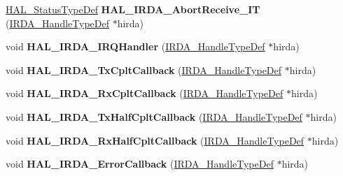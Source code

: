 \begin{DoxyCompactItemize}
\hyperlink{stm32f0xx__hal__def_8h_a63c0679d1cb8b8c684fbb0632743478f}{H\+A\+L\+\_\+\+Status\+Type\+Def} {\bfseries H\+A\+L\+\_\+\+I\+R\+D\+A\+\_\+\+Abort\+Receive\+\_\+\+IT} (\hyperlink{struct_i_r_d_a___handle_type_def}{I\+R\+D\+A\+\_\+\+Handle\+Type\+Def} $\ast$hirda)
\item 
\mbox{\label{group___i_r_d_a___exported___functions___group2_ga816a681851f93d038e7bda5193b9d933}} 
void {\bfseries H\+A\+L\+\_\+\+I\+R\+D\+A\+\_\+\+I\+R\+Q\+Handler} (\hyperlink{struct_i_r_d_a___handle_type_def}{I\+R\+D\+A\+\_\+\+Handle\+Type\+Def} $\ast$hirda)
\item 
\mbox{\label{group___i_r_d_a___exported___functions___group2_gaafb45ea63d8cd87e6856c320135b78dd}} 
void {\bfseries H\+A\+L\+\_\+\+I\+R\+D\+A\+\_\+\+Tx\+Cplt\+Callback} (\hyperlink{struct_i_r_d_a___handle_type_def}{I\+R\+D\+A\+\_\+\+Handle\+Type\+Def} $\ast$hirda)
\item 
\mbox{\label{group___i_r_d_a___exported___functions___group2_gafbebae7dda1e7b54dc664c95802127c6}} 
void {\bfseries H\+A\+L\+\_\+\+I\+R\+D\+A\+\_\+\+Rx\+Cplt\+Callback} (\hyperlink{struct_i_r_d_a___handle_type_def}{I\+R\+D\+A\+\_\+\+Handle\+Type\+Def} $\ast$hirda)
\item 
\mbox{\label{group___i_r_d_a___exported___functions___group2_gab2f5c3c37aae09155b6872f93f12761f}} 
void {\bfseries H\+A\+L\+\_\+\+I\+R\+D\+A\+\_\+\+Tx\+Half\+Cplt\+Callback} (\hyperlink{struct_i_r_d_a___handle_type_def}{I\+R\+D\+A\+\_\+\+Handle\+Type\+Def} $\ast$hirda)
\item 
\mbox{\label{group___i_r_d_a___exported___functions___group2_gab164406c67c36ab562580e3fce8d6165}} 
void {\bfseries H\+A\+L\+\_\+\+I\+R\+D\+A\+\_\+\+Rx\+Half\+Cplt\+Callback} (\hyperlink{struct_i_r_d_a___handle_type_def}{I\+R\+D\+A\+\_\+\+Handle\+Type\+Def} $\ast$hirda)
\item 
\mbox{\label{group___i_r_d_a___exported___functions___group2_ga85ffb4337deb42820d49f3882a728f7f}} 
void {\bfseries H\+A\+L\+\_\+\+I\+R\+D\+A\+\_\+\+Error\+Callback} (\hyperlink{struct_i_r_d_a___handle_type_def}{I\+R\+D\+A\+\_\+\+Handle\+Type\+Def} $\ast$hirda)

\end{DoxyCompactItemize}
